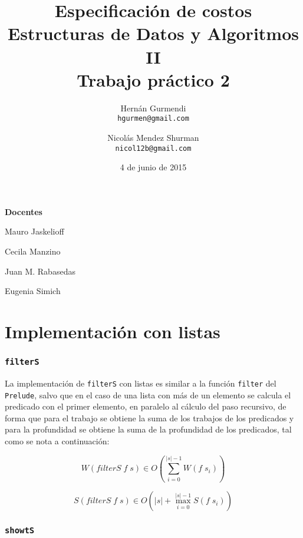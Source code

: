\documentclass[a4paper,10pt]{article}
\author{
    Hernán Gurmendi \\
    \texttt{hgurmen@gmail.com}
    \and Nicolás Mendez Shurman \\
    \texttt{nicol12b@gmail.com}
}
\date{
    4 de junio de 2015
}
\title{
    \Huge Especificación de costos \\
    \Large Estructuras de Datos y Algoritmos II \\
    \large Trabajo práctico 2
}
\begin{document}
\maketitle

\begin{center}
\large \bf Docentes
\end{center}

\begin{center}
Mauro Jaskelioff

Cecila Manzino

Juan M. Rabasedas

Eugenia Simich
\end{center}

\newpage{}


\part*{Implementación con listas}


\section*{\texttt{filterS}}

La implementación de \texttt{filterS} con listas es similar a la función \texttt{filter}
del \texttt{Prelude}, salvo que en el caso de una lista con más de un elemento se
calcula el predicado con el primer elemento, en paralelo al cálculo del paso
recursivo, de forma que para el trabajo se obtiene la suma de los trabajos de los
predicados y para la profundidad se obtiene la suma de la profundidad de los
predicados, tal como se nota a continuación:


\begin{equation*}
    W \left( filterS\; f \; s \right) \in
    O \left( \sum_{i=0}^{\vert s \vert -1} W \left( f \; s_i \right) \right)
\end{equation*}

\begin{equation*}
    S \left( filterS\; f \; s \right) \in
    O \left( \vert s \vert + \max_{i=0}^{\vert s \vert -1} S \left( f \; s_i \right) \right)
\end{equation*}


\section*{\texttt{showtS}}
\end{document}
